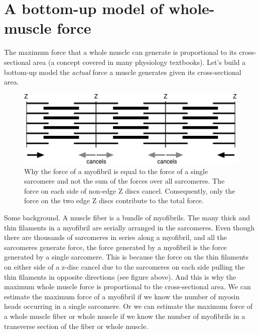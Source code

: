 \documentclass[]{book}
\begin{document}
\section{A bottom-up model of whole-muscle
force}\label{a-bottom-up-model-of-whole-muscle-force}

The maximum force that a whole muscle can generate is proportional to
its cross-sectional area (a concept covered in many physiology
textbooks). Let's build a bottom-up model the \emph{actual} force a
muscle generates given its cross-sectional area.

\begin{figure}
\centering
\includegraphics{images/sarcomere-force-proportional-to-area.png}
\caption{\label{fig:force}Why the force of a myofibril is equal to the force
of a single sarcomere and not the sum of the forces over all sarcomeres.
The force on each side of non-edge Z discs cancel. Consequently, only
the force on the two edge Z discs contribute to the total force.}
\end{figure}

Some background. A muscle fiber is a bundle of myofibrils. The many
thick and thin filaments in a myofibril are serially arranged in the
sarcomeres. Even though there are thousands of sarcomeres in series
along a myofibril, and all the sarcomeres generate force, the force
generated by a myofibril is the force generated by a single sarcomere.
This is because the force on the thin filaments on either side of a
z-disc cancel due to the sarcomeres on each side pulling the thin
filaments in opposite directions (see figure above). And this is why the
maximum whole muscle force is proportional to the cross-sectional area.
We can estimate the maximum force of a myofibril if we know the number
of myosin heads occurring in a single sarcomere. Or we can estimate the
maximum force of a whole muscle fiber or whole muscle if we know the
number of myofibrils in a transverse section of the fiber or whole
muscle.
\end{document}
